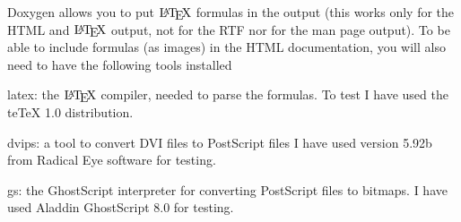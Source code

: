 Doxygen allows you to put $\mbox{\LaTeX}$ formulas in the output (this works only for the HTML and $\mbox{\LaTeX}$ output, not for the RTF nor for the man page output). To be able to include formulas (as images) in the HTML documentation, you will also need to have the following tools installed 
\begin{DoxyItemize}
\item {\ttfamily latex:} the $\mbox{\LaTeX}$ compiler, needed to parse the formulas. To test I have used the teTeX 1.0 distribution. 
\item {\ttfamily dvips:} a tool to convert DVI files to PostScript files I have used version 5.92b from Radical Eye software for testing. 
\item {\ttfamily gs:} the GhostScript interpreter for converting PostScript files to bitmaps. I have used Aladdin GhostScript 8.0 for testing. 
\end{DoxyItemize}

